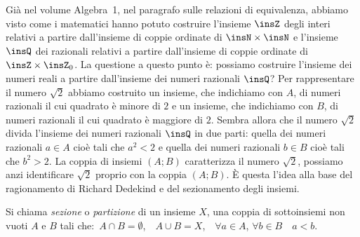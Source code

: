 Già nel volume Algebra~1, nel paragrafo sulle relazioni di equivalenza, abbiamo visto come i matematici hanno potuto costruire l'insieme $\insZ$ degli interi relativi a partire dall'insieme di coppie ordinate di $\insN \times \insN$ e l'insieme $\insQ$ dei razionali relativi a partire dall'insieme di coppie ordinate di $\insZ \times \insZ_{0}$.
La questione a questo punto è: possiamo costruire l'insieme dei numeri reali a partire dall'insieme dei numeri razionali $\insQ$? Per rappresentare il numero $\sqrt{2}$ abbiamo costruito un insieme, che indichiamo con $A$, di numeri razionali il cui quadrato è minore di $2$ e un insieme, che indichiamo con $B$, di numeri razionali il cui quadrato è maggiore di $2$. Sembra allora che il numero $\sqrt{2}$ divida l'insieme dei numeri razionali $\insQ$ in due parti: quella dei numeri razionali $a\in A$ cioè tali che $a^{2}<2$ e quella dei numeri razionali $b\in B$ cioè tali che $b^{2}>2$. La coppia di insiemi $(A;B)$ caratterizza il numero $\sqrt{2}$, possiamo anzi identificare $\sqrt{2}$ proprio con la coppia $(A;B)$.
È questa l'idea alla base del ragionamento di Richard Dedekind e del sezionamento degli insiemi.

\begin{definizione}
Si chiama \emph{sezione} o \emph{partizione} di un insieme $X$, una coppia di sottoinsiemi non vuoti $A$ e $B$ tali che:~$A \cap B=\emptyset$,~~$A \cup B=X$,~~$\forall a \in A$, $\forall b \in B$~~$a<b$.
\end{definizione}

